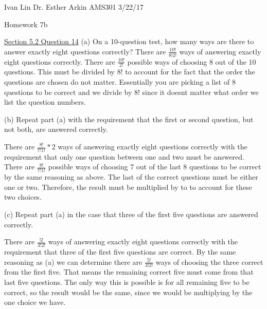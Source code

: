 \documentclass{article}
\begin{document}
Ivan Lin\newline{}
Dr. Esther Arkin\newline{}
AMS301\newline{}
3/22/17

\begin{center}
  Homework 7b
\end{center}

\underline{Section 5.2 Question 14}\newline{}
(a) On a 10-question test, how many ways are there to answer exactly eight
questions correctly?\newline{}
There are $\frac{10!}{8!2!}$ ways of answering exactly eight questions correctly. There are $\frac{10!}{2!}$ possible ways of choosing 8 out of the 10 questions. This must be divided by $8!$ to account for the fact that the order the questions are chosen do not matter. Essentially you are picking a list of 8 questions to be correct and we divide by $8!$ since it doesnt matter what order we list the question numbers.\newline{}\newline{}

(b) Repeat part (a) with the requirement that the first or second question, but
not both, are answered correctly.

There are $\frac{8!}{7!1!}*2$ ways of answering exactly eight questions correctly with the requirement that only one question between one and two must be answered. There are $\frac{8!}{7!1!}$ possible ways of choosing 7 out of the last 8 questions to be correct by the same reasoning as above. The last of the correct questions must be either one or two. Therefore, the result must be multiplied by to to account for these two choices.\newline{}\newline{}

(c) Repeat part (a) in the case that three of the first five questions are answered
correctly.

There are $\frac{5!}{3!2!}$ ways of answering exactly eight questions correctly with the requirement that three of the first five questions are correct. By the same reasoning as (a) we can determine there are $\frac{5!}{3!2!}$ ways of choosing the three correct from the first five. That means the remaining correct five must come from that last five questions. The only way this is possible is for all remaining five to be correct, so the result would be the same, since we would be multiplying by the one choice we have. \newline{}\newline{}
\end{document}
